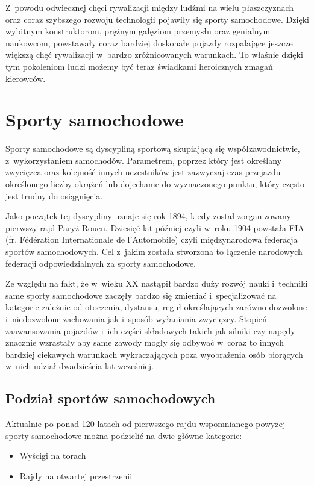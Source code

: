 \documentclass[../Kamil_Kowalewski_Main.tex]{subfiles}
\begin{document}
 {

    Z~powodu odwiecznej chęci rywalizacji między ludźmi na wielu płaszczyznach
    oraz coraz szybszego rozwoju technologii pojawiły się
    sporty samochodowe. Dzięki wybitnym konstruktorom, prężnym gałęziom przemysłu
    oraz genialnym naukowcom, powstawały coraz bardziej doskonałe pojazdy
    rozpalające jeszcze większą chęć rywalizacji w~bardzo zróżnicowanych
    warunkach. To właśnie dzięki tym pokoleniom ludzi możemy być teraz świadkami
    heroicznych zmagań kierowców.

    \section{Sporty samochodowe}
    \label{chapter2:wprowadzenie_sporty:sporty} {
        Sporty samochodowe są dyscypliną sportową skupiającą się współzawodnictwie,
        z~wykorzystaniem samochodów. Parametrem, poprzez który jest określany zwycięzca
        oraz kolejność innych uczestników jest zazwyczaj czas przejazdu określonego
        liczby okrążeń lub dojechanie do wyznaczonego punktu, który często jest trudny
        do osiągnięcia.

        Jako początek tej dyscypliny uznaje się rok 1894, kiedy został zorganizowany
        pierwszy rajd Paryż-Rouen. Dziesięć lat później czyli w~roku 1904 powstała FIA
        (fr. Fédération Internationale de l’Automobile) czyli międzynarodowa federacja
        sportów samochodowych. Cel z~jakim została stworzona to łączenie narodowych
        federacji odpowiedzialnych za sporty samochodowe.

        Ze względu na fakt, że w~wieku XX nastąpił bardzo duży rozwój nauki i~techniki
        same sporty samochodowe zaczęły bardzo się zmieniać i~specjalizować na
        kategorie zależnie od otoczenia, dystansu, reguł określających zarówno
        dozwolone i~niedozwolone zachowania jak i~sposób wyłaniania zwycięzcy. Stopień
        zaawansowania pojazdów i~ich części składowych takich jak silniki czy napędy
        znacznie wzrastały aby same zawody mogły się odbywać w~coraz to innych bardziej
        ciekawych warunkach wykraczających poza wyobrażenia osób biorących w~nich
        udział dwadzieścia lat wcześniej.

        \subsection{Podział sportów samochodowych}
        \label{chapter2:wprowadzenie_sporty:sporty:podzial} {
            Aktualnie po ponad 120 latach od pierwszego rajdu wspomnianego powyżej sporty
            samochodowe można podzielić na dwie główne kategorie:
            \begin{itemize}[noitemsep,topsep=2pt]
                \item Wyścigi na torach
                \item Rajdy na otwartej przestrzenii
            \end{itemize}

}}}
\end{document}
